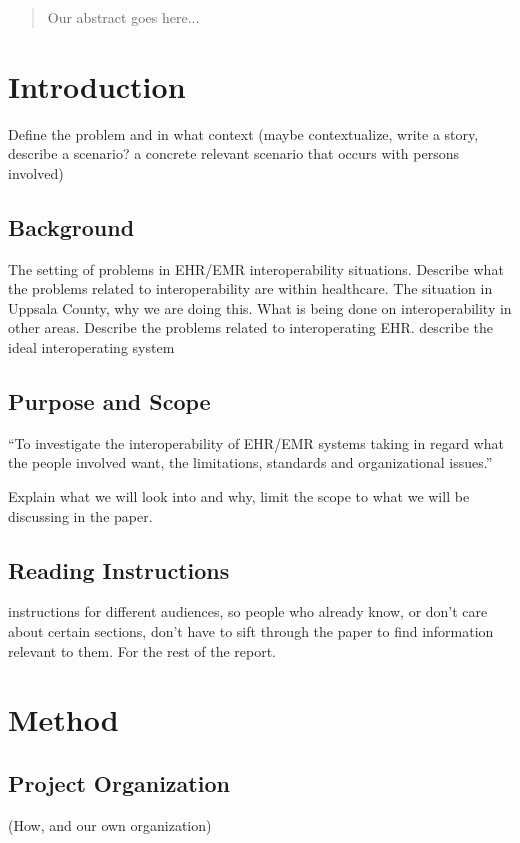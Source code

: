 \documentclass[12pt]{article}
\begin{document}
\nocite{big}
\nocite{Sh:1}
\nocite{small} 




\tableofcontents
\newpage

\begin{abstract}
Our abstract goes here...
\end{abstract}
\newpage

\section{Introduction}
Define the problem and in what context (maybe contextualize, write a story, describe a scenario? a concrete relevant scenario that occurs with persons involved)

\subsection{Background}
The setting of problems in EHR/EMR interoperability situations. Describe what the problems related to interoperability are within healthcare. The situation in Uppsala County, why we are doing this. What is being done on interoperability in other areas. Describe the problems related to interoperating EHR.
describe the ideal interoperating system

\subsection{Purpose and Scope}
“To investigate the interoperability of
EHR/EMR systems taking in regard what
the people involved want, the limitations,
standards and organizational issues.”

Explain what we will look into and why, limit the scope to what we will be discussing in the paper.

\subsection{Reading Instructions}
instructions for different audiences, so people who already know, or don't care about certain sections, don't have to sift through the paper to find information relevant to them. For the rest of the report.


\section{Method}

\subsection{Project Organization}
 (How, and our own organization)
\end{document}
